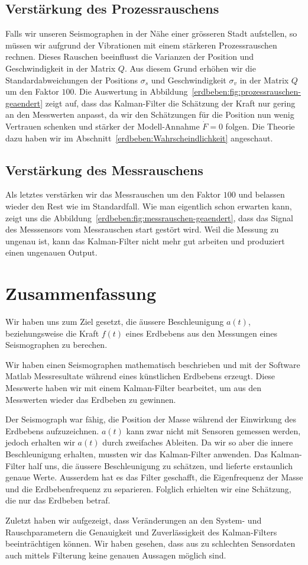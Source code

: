 \subsection{Verstärkung des Prozessrauschens}
Falls wir unseren Seismographen in der Nähe einer grösseren Stadt aufstellen, so müssen wir aufgrund der Vibrationen mit einem stärkeren Prozessrauschen rechnen.
Dieses Rauschen beeinflusst die Varianzen der Position und Geschwindigkeit in der Matrix $Q$.
Aus diesem Grund erhöhen wir die Standardabweichungen der Positions $\sigma_s$ und Geschwindigkeit $\sigma_v$ in der Matrix $Q$ um den Faktor $100$.
Die Auswertung in Abbildung~\ref{erdbeben:fig:prozessrauschen-geaendert} zeigt auf,
dass das Kalman-Filter die Schätzung der Kraft nur gering an den Messwerten anpasst,
da wir den Schätzungen für die Position nun wenig Vertrauen schenken und stärker der Modell-Annahme $\dot F = 0$ folgen.
Die Theorie dazu haben wir im Abschnitt~\ref{erdbeben:Wahrscheindlichkeit} angeschaut.


\subsection{Verstärkung des Messrauschens}
Als letztes verstärken wir das Messrauschen um den Faktor $100$ und belassen wieder den Rest wie im Standardfall.
Wie man eigentlich schon erwarten kann,
zeigt uns die Abbildung~\ref{erdbeben:fig:messrauschen-geaendert},
dass das Signal des Messsensors vom Messrauschen start gestört wird.
Weil die Messung zu ungenau ist,
kann das Kalman-Filter nicht mehr gut arbeiten und produziert einen ungenauen Output.


\section{Zusammenfassung}
Wir haben uns zum Ziel gesetzt,
die äussere Beschleunigung $a(t)$,
beziehungsweise die Kraft $f(t)$ eines Erdbebens
aus den Messungen eines Seismographen zu berechen.

Wir haben einen Seismographen mathematisch beschrieben und
mit der Software Matlab Messresultate während eines künstlichen Erdbebens erzeugt.
Diese Messwerte haben wir mit einem Kalman-Filter bearbeitet,
um aus den Messwerten wieder das Erdbeben zu gewinnen.

Der Seismograph war fähig, die Position der Masse während der Einwirkung des Erdbebens aufzuzeichnen.
$a(t)$ kann zwar nicht mit Sensoren gemessen werden, jedoch erhalten wir $a(t)$ durch zweifaches Ableiten.
Da wir so aber die innere Beschleunigung erhalten, mussten wir das Kalman-Filter anwenden.
Das Kalman-Filter half uns, die äussere Beschleunigung zu schätzen, und lieferte erstaunlich genaue Werte.
Ausserdem hat es das Filter geschafft, die Eigenfrequenz der Masse und die Erdbebenfrequenz zu separieren.
Folglich erhielten wir eine Schätzung, die nur das Erdbeben betraf.

Zuletzt haben wir aufgezeigt,
dass Veränderungen an den System- und Rauschparametern die Genauigkeit und Zuverlässigkeit
des Kalman-Filters beeinträchtigen können.
Wir haben gesehen, dass aus zu schlechten Sensordaten auch mittels Filterung keine genauen Aussagen möglich sind.

